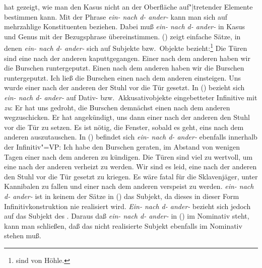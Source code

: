 \citet*[Kapitel~6]{Hoehle83a}
hat gezeigt, wie man den Kasus nicht an der Oberfläche
auf"|tretender Elemente bestimmen kann. Mit der Phrase {\em ein- nach d- ander-\/} kann
man sich auf mehrzahlige Konstituenten beziehen. Dabei muß \emph{ein- nach d- ander-}
in Kasus und Genus mit der Bezugsphrase übereinstimmen.
() zeigt einfache Sätze, in denen \emph{ein- nach d- ander-} sich auf Subjekte bzw.\
Objekte bezieht:\footnote{
         sind von Höhle.
}
\eal
\label{bsp-tueren-hoehle}
\ex Die Türen sind eine nach der anderen kaputtgegangen.
\ex Einer nach dem anderen haben wir die Burschen runtergeputzt.
\ex Einen nach dem anderen haben wir die Burschen runtergeputzt.
\ex Ich ließ die Burschen einen nach dem anderen einsteigen.
\ex Uns wurde einer nach der anderen der Stuhl vor die Tür gesetzt.
\zl
In () bezieht sich \emph{ein- nach d- ander-} auf Dativ- bzw.\ Akkusativobjekte
eingebetteter Infinitive mit \emph{zu}:
\eal
\ex Er hat uns gedroht, die Burschen demnächst einen nach dem anderen wegzuschicken.
\ex Er hat angekündigt, uns dann einer nach der anderen den Stuhl vor die Tür zu setzen.
\ex Es ist nötig, die Fenster, sobald es geht, eins nach dem anderen auszutauschen.
\zl
In () befindet sich \emph{ein- nach d- ander-} ebenfalls innerhalb der Infinitiv"=VP:
\eal
\label{bsp-nominativ-inkoh}
\ex Ich habe den Burschen geraten, im Abstand von wenigen Tagen einer nach dem anderen
      zu kündigen.\label{bsp-nominativ-inkoh-geraten}
\ex Die Türen sind viel zu wertvoll, um eine nach der anderen verheizt zu werden.
\ex Wir sind es leid, eine nach der anderen den Stuhl vor die Tür gesetzt zu kriegen.
\ex Es wäre fatal für die Sklavenjäger, unter Kannibalen zu fallen und einer nach dem
      anderen verspeist zu werden.
\zl
{\em ein- nach d- ander-\/} ist in keinem der Sätze in () das Subjekt,
da dieses in dieser
Form Infinitivkonstruktion nie realisiert wird. {\em Ein- nach d- ander-\/} bezieht sich
jedoch auf das Subjekt des \zuis. Daraus daß {\em ein- nach d- ander-\/} in (\mex{0}) im Nominativ
steht, kann man schließen, daß das nicht realisierte Subjekt ebenfalls im Nominativ
stehen muß.

